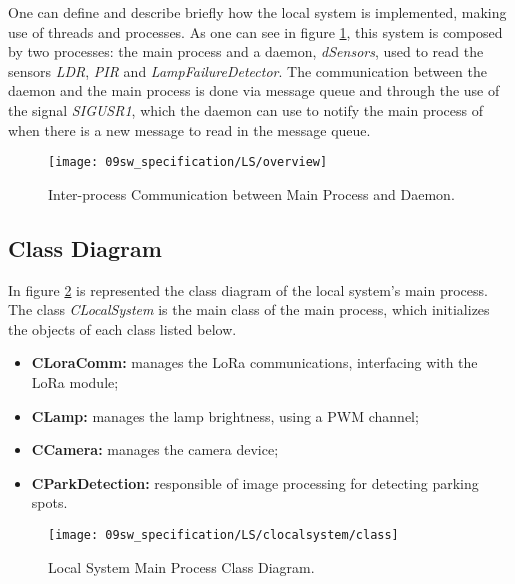 One can define and describe briefly how the local system is implemented, making use of threads and processes. As one can see in figure \ref{fig:task_overview}, this system is composed by two processes: the main process and a daemon, \textit{dSensors}, used to read the sensors \textit{LDR}, \textit{PIR} and \textit{LampFailureDetector}. The communication between the daemon and the main process is done via message queue and through the use of the signal \textit{SIGUSR1}, which the daemon can use to notify the main process of when there is a new message to read in the message queue.

\begin{figure}[H]
	\centering
	\texttt{[image: 09sw\_specification/LS/overview]}
	\caption{Inter-process Communication between Main Process and Daemon.}
	\label{fig:task_overview}
\end{figure}

\subsection{Class Diagram}
In figure \ref{fig:clocalsystem} is represented the class diagram of the local system's main process. The class \textit{CLocalSystem} is the main class of the main process, which initializes the objects of each class listed below.

\begin{itemize}
	\item \textbf{CLoraComm:} manages the LoRa communications, interfacing with the LoRa module;
	\item \textbf{CLamp:} manages the lamp brightness, using a PWM channel;	
	\item \textbf{CCamera:} manages the camera device;
	\item \textbf{CParkDetection:} responsible of image processing for detecting parking spots.
\end{itemize}

\begin{figure}[H]
	\centering
	\texttt{[image: 09sw\_specification/LS/clocalsystem/class]}
	\caption{Local System Main Process Class Diagram.}
	\label{fig:clocalsystem}
\end{figure}

